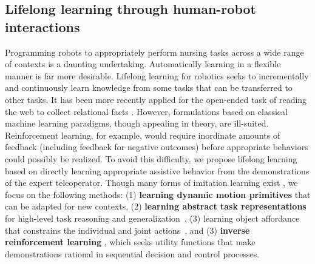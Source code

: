 \documentclass[letterpaper, 11 pt, onecolumn]{article}
\newcommand{\jie}[1]{\textcolor{green}{JF: #1}}
\begin{document}




\subsection{Lifelong learning through human-robot interactions}\label{sec:related-learning}




Programming robots to appropriately perform nursing tasks across a wide range of contexts is a daunting undertaking.  
Automatically learning in a flexible manner is far more desirable.
Lifelong learning for robotics \cite{thrun1995lifelong,thrun1995lifelong2,thrun1998lifelong} seeks to incrementally and continuously learn knowledge from some tasks that can be transferred to other tasks. 
It has been more recently applied for the open-ended task of reading the web to collect relational facts \cite{banko2007strategies,carlson2010toward}. 
However, formulations based on classical machine learning paradigms, though appealing in theory, are ill-suited.
Reinforcement learning, for example, would require inordinate amounts of
feedback (including feedback for negative outcomes)
before appropriate behaviors could possibly be realized.
To avoid this difficulty, we propose lifelong learning based on directly learning appropriate assistive behavior from the demonstrations of the expert teleoperator.
Though many forms of imitation learning exist \cite{argall2009survey}, we focus on the following methods: (1) {\bf learning dynamic motion primitives} \cite{matsubara2011learning,kulic2012incremental} that can be adapted for new contexts, (2) \textbf{learning abstract task representations} for high-level task reasoning and generalization~\cite{niekum2013semantically,konidaris2012robot,konidaris2018skills}, (3) learning object affordance that constrains the individual and joint actions~\cite{aksoy2011learning,knoblich2011psychological,shu2017learning}, and (3) {\bf inverse reinforcement learning} \cite{ng2000algorithms,abbeel2004apprenticeship}, which seeks utility functions that make demonstrations rational in sequential decision and control processes.
\end{document}
